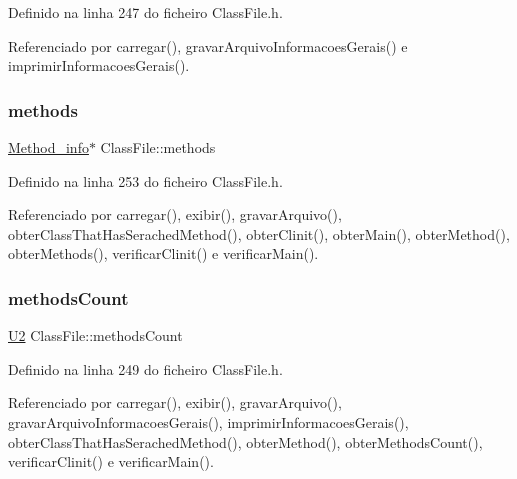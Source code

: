 Definido na linha 247 do ficheiro Class\+File.\+h.



Referenciado por carregar(), gravar\+Arquivo\+Informacoes\+Gerais() e imprimir\+Informacoes\+Gerais().

\mbox{\label{classClassFile_a5906980e6c5121e5a864346fd3617083}} 
\subsubsection{\texorpdfstring{methods}{methods}}
{\footnotesize\ttfamily \hyperlink{structMethod__info}{Method\+\_\+info}$\ast$ Class\+File\+::methods\hspace{0.3cm}{\ttfamily [private]}}



Definido na linha 253 do ficheiro Class\+File.\+h.



Referenciado por carregar(), exibir(), gravar\+Arquivo(), obter\+Class\+That\+Has\+Serached\+Method(), obter\+Clinit(), obter\+Main(), obter\+Method(), obter\+Methods(), verificar\+Clinit() e verificar\+Main().

\mbox{\label{classClassFile_a4c362d4adfeaad02f4517caf1ba58103}} 
\subsubsection{\texorpdfstring{methods\+Count}{methodsCount}}
{\footnotesize\ttfamily \hyperlink{BasicTypes_8h_a90240657108b1b457eef9d3f76e0202e}{U2} Class\+File\+::methods\+Count\hspace{0.3cm}{\ttfamily [private]}}



Definido na linha 249 do ficheiro Class\+File.\+h.



Referenciado por carregar(), exibir(), gravar\+Arquivo(), gravar\+Arquivo\+Informacoes\+Gerais(), imprimir\+Informacoes\+Gerais(), obter\+Class\+That\+Has\+Serached\+Method(), obter\+Method(), obter\+Methods\+Count(), verificar\+Clinit() e verificar\+Main().

\mbox{\label{classClassFile_ab0d3a4474a9907dc61893d0293525b38}} 
